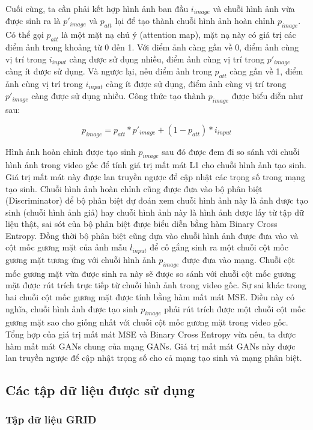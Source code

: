 Cuối cùng, ta cần phải kết hợp hình ảnh ban đầu $i_{image}$ và chuỗi hình ảnh vừa được sinh ra là $p'_{image}$ và $p_{att}$ lại để tạo thành chuỗi hình ảnh hoàn chỉnh $p_{image}$. Có thể gọi $p_{att}$ là một mặt nạ chú ý (attention map), mặt nạ này có giá trị các điểm ảnh trong khoảng từ 0 đến 1. Với điểm ảnh càng gần về 0, điểm ảnh cùng vị trí trong $i_{input}$ càng được sử dụng nhiều, điểm ảnh cùng vị trí trong $p'_{image}$ càng ít được sử dụng. Và ngược lại, nếu điểm ảnh trong $p_{att}$ càng gần về 1, điểm ảnh cùng vị trí trong $i_{input}$ càng ít được sử dụng, điểm ảnh cùng vị trí trong $p'_{image}$ càng được sử dụng nhiều. Công thức tạo thành $p_{image}$ được biểu diễn như sau:

\begin{equation}
    p_{image}=p_{att}*p'_{image}+(1-p_{att})*i_{input}
\end{equation}

Hình ảnh hoàn chỉnh được tạo sinh $p_{image}$ sau đó được đem đi so sánh với chuỗi hình ảnh trong video gốc để tính giá trị mất mát L1 cho chuỗi hình ảnh tạo sinh. Giá trị mất mát này được lan truyền ngược để cập nhật các trọng số trong mạng tạo sinh. Chuỗi hình ảnh hoàn chỉnh cũng được đưa vào bộ phân biệt (Discriminator) để bộ phân biệt dự đoán xem chuỗi hình ảnh này là ảnh được tạo sinh (chuỗi hình ảnh giả) hay chuỗi hình ảnh này là hình ảnh được lấy từ tập dữ liệu thật, sai sót của bộ phân biệt được biểu diễn bằng hàm Binary Cross Entropy. Đồng thời bộ phân biệt cũng dựa vào chuỗi hình ảnh được đưa vào và cột mốc gương mặt của ảnh mẫu $l_{input}$ để cố gắng sinh ra một chuỗi cột mốc gương mặt tương ứng với chuỗi hình ảnh $p_{image}$ được đưa vào mạng. Chuỗi cột mốc gương mặt vừa được sinh ra này sẽ được so sánh với chuỗi cột mốc gương mặt được rút trích trực tiếp từ chuỗi hình ảnh trong video gốc. Sự sai khác trong hai chuỗi cột mốc gương mặt được tính bằng hàm mất mát MSE. Điều này có nghĩa, chuỗi hình ảnh được tạo sinh $p_{image}$ phải rút trích được một chuỗi cột mốc gương mặt sao cho giống nhất với chuỗi cột mốc gương mặt trong video gốc. Tổng hợp của giá trị mất mát MSE và Binary Cross Entropy vừa nêu, ta được hàm mất mát GANs chung của mạng GANs. Giá trị mất mát GANs này được lan truyền ngược để cập nhật trọng số cho cả mạng tạo sinh và mạng phân biệt.

\subsection{Các tập dữ liệu được sử dụng}
\subsubsection{Tập dữ liệu GRID \cite{grid}}

